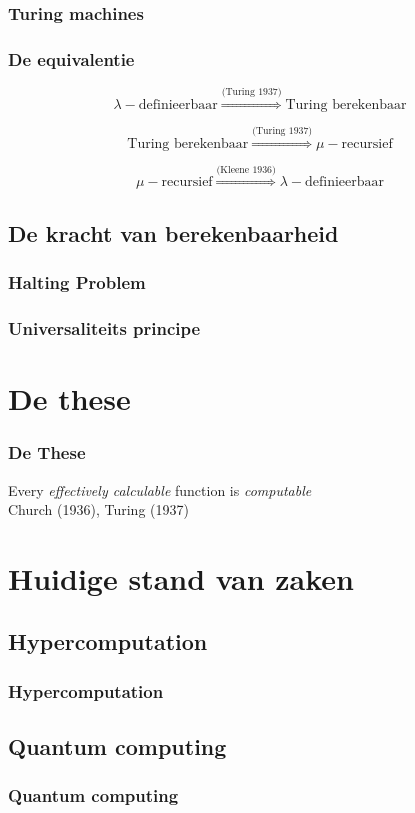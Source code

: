 \documentclass{beamer}
\begin{document}
\begin{frame}
    \frametitle{Turing machines}
\end{frame}

\begin{frame}
    \frametitle{De equivalentie}

    $$\lambda-\text{definieerbaar} \stackrel{\scriptscriptstyle \text{(Turing 1937)}}{\Longrightarrow} \text{Turing berekenbaar}$$

    $$\text{Turing berekenbaar} \stackrel{\scriptscriptstyle \text{(Turing 1937)}}{\Longrightarrow} \mu-\text{recursief} $$

    $$\mu-\text{recursief} \stackrel{\scriptscriptstyle \text{(Kleene 1936)}}{\Longrightarrow} \lambda-\text{definieerbaar} $$
\end{frame}

\subsection{De kracht van berekenbaarheid}
\begin{frame}
    \frametitle{Halting Problem}
\end{frame}

\begin{frame}
    \frametitle{Universaliteits principe}
\end{frame}

\section{De these}
\begin{frame}
    \frametitle{De These}
    \begin{center}
        {\Large
            Every \emph{effectively calculable} function is \emph{computable}
        }
        \\
        \bigskip
        \bigskip
        Church (1936), Turing (1937)
    \end{center}
\end{frame}


\section{Huidige stand van zaken}
\subsection{Hypercomputation}
\begin{frame}
    \frametitle{Hypercomputation}
\end{frame}
\subsection{Quantum computing}
\begin{frame}
    \frametitle{Quantum computing}
\end{frame}
\end{document}
